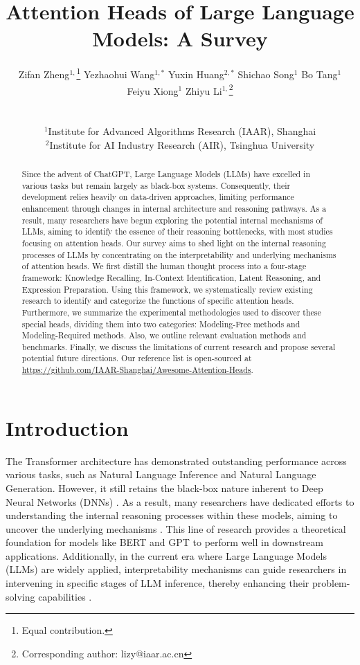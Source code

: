 \documentclass{article}
\title{Attention Heads of Large Language Models: A Survey}
\author{
    \begin{tabular}{c}
    Zifan Zheng$^{1,}$\thanks{Equal contribution.} \quad 
    Yezhaohui Wang$^{1,*}$ \quad 
    Yuxin Huang$^{2,*}$ \quad 
    Shichao Song$^{1}$ \quad
    Bo Tang$^{1}$ \vspace{.5mm} \\
    Feiyu Xiong$^{1}$ \quad 
    Zhiyu Li$^{1,}$\thanks{Corresponding author: lizy@iaar.ac.cn}
    \end{tabular}
    \\
    \begin{tabular}{c}
    $^1$Institute for Advanced Algorithms Research (IAAR), Shanghai \\
    $^2$Institute for AI Industry Research (AIR), Tsinghua University \\
    \end{tabular}
}
\date{}
\begin{document}
\maketitle

\begin{abstract}
Since the advent of ChatGPT, Large Language Models (LLMs) have excelled in various tasks but remain largely as black-box systems. Consequently, their development relies heavily on data-driven approaches, limiting performance enhancement through changes in internal architecture and reasoning pathways. As a result, many researchers have begun exploring the potential internal mechanisms of LLMs, aiming to identify the essence of their reasoning bottlenecks, with most studies focusing on attention heads.
Our survey aims to shed light on the internal reasoning processes of LLMs by concentrating on the interpretability and underlying mechanisms of attention heads. We first distill the human thought process into a four-stage framework: Knowledge Recalling, In-Context Identification, Latent Reasoning, and Expression Preparation. Using this framework, we systematically review existing research to identify and categorize the functions of specific attention heads. Furthermore, we summarize the experimental methodologies used to discover these special heads, dividing them into two categories: Modeling-Free methods and Modeling-Required methods. Also, we outline relevant evaluation methods and benchmarks. Finally, we discuss the limitations of current research and propose several potential future directions. Our reference list is open-sourced at \url{https://github.com/IAAR-Shanghai/Awesome-Attention-Heads}.
\end{abstract}



\section{Introduction}
The Transformer architecture \citep{AttentionIsAllYouNeed} has demonstrated outstanding performance across various tasks, such as Natural Language Inference and Natural Language Generation. However, it still retains the black-box nature inherent to Deep Neural Networks (DNNs) \citep{LLMblackbox_gilpin2018, LLMblackbox_lipton2018}. As a result, many researchers have dedicated efforts to understanding the internal reasoning processes within these models, aiming to uncover the underlying mechanisms \citep{DNN_Interp_Montavon}. This line of research provides a theoretical foundation for models like BERT \citep{BERT_MODEL} and GPT \citep{GPT2_MODEL} to perform well in downstream applications. Additionally, in the current era where Large Language Models (LLMs) are widely applied, interpretability mechanisms can guide researchers in intervening in specific stages of LLM inference, thereby enhancing their problem-solving capabilities \citep{AttnLookback_24_arXiv_MIT, MaskLayer_24_arXiv_NUDT, ITI_23_NIPS_harvard}.
\end{document}
